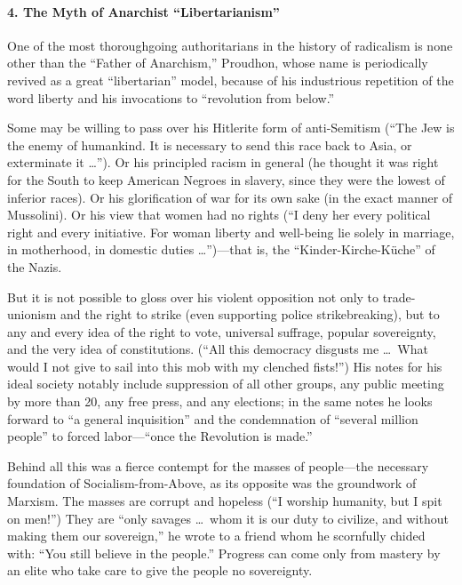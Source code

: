 \paragraph{4. The Myth of Anarchist ``Libertarianism''}

One of the most thoroughgoing authoritarians in the history of radicalism is none other than the ``Father of Anarchism,'' Proudhon, whose name is periodically revived as a great ``libertarian'' model, because of his industrious repetition of the word liberty and his invocations to ``revolution from below.''

Some may be willing to pass over his Hitlerite form of anti-Semitism (``The Jew is the enemy of humankind. It is necessary to send this race back to Asia, or exterminate it \ldots''). Or his principled racism in general (he thought it was right for the South to keep American Negroes in slavery, since they were the lowest of inferior races). Or his glorification of war for its own sake (in the exact manner of Mussolini). Or his view that women had no rights (``I deny her every political right and every initiative. For woman liberty and well-being lie solely in marriage, in motherhood, in domestic duties \ldots'')---that is, the ``Kinder-Kirche-K\"{u}che'' of the Nazis.

But it is not possible to gloss over his violent opposition not only to trade-unionism and the right to strike (even supporting police strikebreaking), but to any and every idea of the right to vote, universal suffrage, popular sovereignty, and the very idea of constitutions. (``All this democracy disgusts me \ldots\ What would I not give to sail into this mob with my clenched fists!'') His notes for his ideal society notably include suppression of all other groups, any public meeting by more than 20, any free press, and any elections; in the same notes he looks forward to ``a general inquisition'' and the condemnation of ``several million people'' to forced labor---``once the Revolution is made.''

Behind all this was a fierce contempt for the masses of people---the necessary foundation of Socialism-from-Above, as its opposite was the groundwork of Marxism. The masses are corrupt and hopeless (``I worship humanity, but I spit on men!'') They are ``only savages \ldots\ whom it is our duty to civilize, and without making them our sovereign,'' he wrote to a friend whom he scornfully chided with: ``You still believe in the people.'' Progress can come only from mastery by an elite who take care to give the people no sovereignty.

